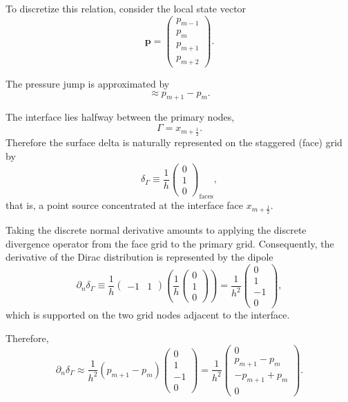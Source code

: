 \documentclass[a4paper,11pt]{article}
\begin{document}
To discretize this relation, consider the local state vector
\[
\mathbf p
=
\begin{pmatrix}
p_{m-1}\\
p_m\\
p_{m+1}\\
p_{m+2}
\end{pmatrix}.
\]

The pressure jump is approximated by
\begin{equation}
[p]
\approx
p_{m+1}-p_m.
\end{equation}

The interface lies halfway between the primary nodes,
\[
\Gamma=x_{m+\frac12}.
\]
Therefore the surface delta is naturally represented on the staggered
(face) grid by
\begin{equation}
\delta_\Gamma
\equiv
\frac1h
\begin{pmatrix}
0\\
1\\
0
\end{pmatrix}_{\mathrm{faces}},
\end{equation}
that is, a point source concentrated at the interface face
$x_{m+\frac12}$.

Taking the discrete normal derivative amounts to applying the discrete
divergence operator from the face grid to the primary grid. Consequently,
the derivative of the Dirac distribution is represented by the dipole
\begin{equation}
\partial_n\delta_\Gamma
\equiv
\frac1h
\begin{pmatrix}
-1 & 1
\end{pmatrix}
\left(
\frac1h
\begin{pmatrix}
0\\
1\\
0
\end{pmatrix}
\right)
=
\frac1{h^2}
\begin{pmatrix}
0\\
1\\
-1\\
0
\end{pmatrix},
\end{equation}
which is supported on the two grid nodes adjacent to the interface.

Therefore,
\begin{equation}
[p]\partial_n\delta_\Gamma
\approx
\frac1{h^2}
(p_{m+1}-p_m)
\begin{pmatrix}
0\\
1\\
-1\\
0
\end{pmatrix}
=
\frac1{h^2}
\begin{pmatrix}
0\\
p_{m+1}-p_m\\
-p_{m+1}+p_m\\
0
\end{pmatrix}.
\end{equation}
\end{document}
